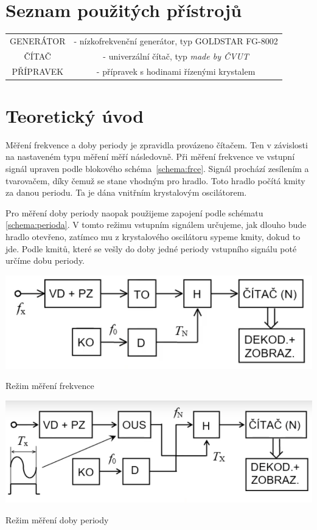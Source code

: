 \documentclass[a4paper,12pt]{article}   %
\begin{document}
\section{Seznam použitých přístrojů}
\begin{table}
  \begin{tabular}{cc}
    GENERÁTOR &- nízkofrekvenční generátor, typ GOLDSTAR FG-8002\\
    ČÍTAČ &- univerzální čítač, typ \textit{made by ČVUT}\\
    PŘÍPRAVEK &- přípravek s hodinami řízenými krystalem\\
  \end{tabular}
\end{table}
\section{Teoretický úvod}
Měření frekvence a doby periody je zpravidla provázeno čítačem. Ten v závislosti na nastaveném typu měření měří následovně. Při měření frekvence ve vstupní signál upraven podle blokového schéma~\ref{schema:frce}. Signál prochází zesílením a tvarovačem, díky čemuž se stane vhodným pro hradlo. Toto hradlo počítá kmity za danou periodu. Ta je dána vnitřním krystalovým oscilátorem.

Pro měření doby periody naopak použijeme zapojení podle schématu \ref{schema:perioda}. V tomto režimu vstupním signálem určujeme, jak dlouho bude hradlo otevřeno, zatímco mu z krystalového oscilátoru sypeme kmity, dokud to jde. Podle kmitů, které se vešly do doby jedné periody vstupního signálu poté určíme dobu periody.
\begin{schema}[h!]
  \centering
  \includegraphics[width=.6\textwidth]{frce.png}
  \caption{Režim měření frekvence}
  \label{schema:frce}
\end{schema}

\begin{schema}[h!]
  \centering
  \includegraphics[width=.6\textwidth]{perioda.png}
  \caption{Režim měření doby periody}
  \label{schema:perioda}
\end{schema}
\end{document}
